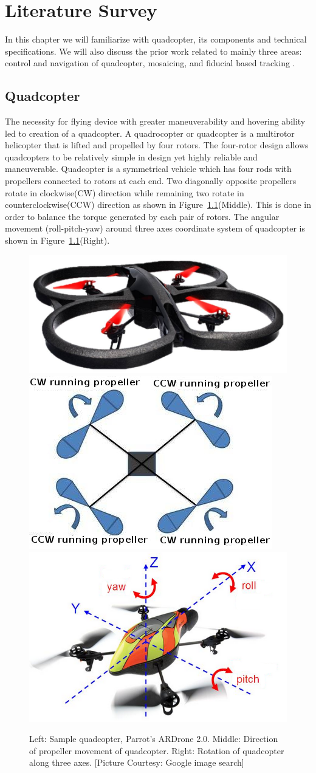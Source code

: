 \chapter{Literature Survey}
\label{ch:quadcopter}
In this chapter we will familiarize with quadcopter, its components and
technical specifications. We will also discuss the prior work related to
mainly three areas: control and navigation of quadcopter, mosaicing, and
fiducial based tracking . 
\section{Quadcopter}
The necessity for flying device with greater maneuverability and hovering
ability led to creation of a quadcopter. A quadrocopter or quadcopter  is a
multirotor helicopter that is lifted and propelled by four rotors. The
four-rotor design allows quadcopters to be relatively simple in design yet
highly reliable and maneuverable. Quadcopter  is a  symmetrical vehicle which
has four rods with propellers connected to rotors  at each end. Two diagonally
opposite propellers rotate in clockwise(CW) direction while remaining  two
rotate in counterclockwise(CCW) direction as shown in
Figure~\ref{fig:quadcopter}(Middle). This is done in order to balance the
torque generated by each pair of rotors. The angular movement (roll-pitch-yaw)
around three axes coordinate system of quadcopter is shown in
Figure~\ref{fig:quadcopter}(Right).


\begin{figure}[b!]
  \includegraphics[width=0.3\linewidth]{images/ardrone2}	
  \includegraphics[width=0.34\linewidth]{images/quadrotor}
  \includegraphics[width=0.34\linewidth]{images/rpy}
  \caption[Quadcopter Motions]{Left: Sample quadcopter, Parrot's ARDrone 2.0.
  Middle: Direction of propeller movement of quadcopter. Right: Rotation of
  quadcopter along three axes. [Picture Courtesy: Google image search]}
  \label{fig:quadcopter}
\end{figure}

